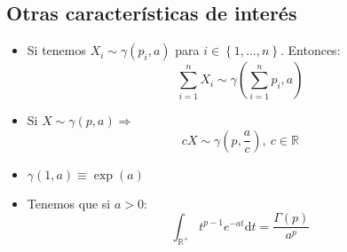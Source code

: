 \subsection{Otras características de interés}
\begin{itemize}
    \item Si tenemos $X_i \sim \gamma\left( p_i, a \right)$ para $i \in \left\{ 1, \ldots, n \right\}$. Entonces:
    \[
    \sum_{i=1}^{n} X_i \sim \gamma\left( \sum_{i=1}^{n} p_i, a \right) 
    \]
    \item Si $X \sim \gamma\left( p, a \right) \Rightarrow$
    \[
    c X \sim \gamma\left( p, \frac{a}{c} \right),\ c \in \mathbb{R}
    \]
    \item $\gamma\left( 1, a \right) \equiv \exp\left( a \right)$

    \item Tenemos que si $a > 0$:
    \[
    \int_{\mathbb{R}^+} t^{p-1} e^{-at} \mathrm{d}t = \frac{\Gamma\left( p \right)}{a^p}
    \]

\end{itemize}
